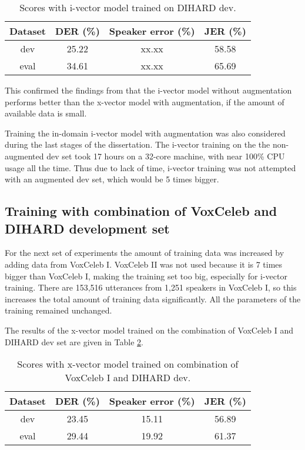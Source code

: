 		\begin{table}[h]
			\centering
			\begin{tabular}{|c|c|c|c|}
				\hline
				Dataset & DER (\%) & Speaker error (\%) & JER (\%) \\
				\hline
				dev & 25.22 & xx.xx & 58.58 \\
				\hline
				eval & 34.61 & xx.xx & 65.69 \\
				\hline
			\end{tabular}
			\caption{Scores with i-vector model trained on DIHARD dev.}
			\label{table-dev-ivec}
		\end{table}
		
		This confirmed the findings from \cite{huang2018jhu} that the i-vector model without augmentation performs better than the x-vector model with augmentation, if the amount of available data is small.
		
		Training the in-domain i-vector model with augmentation was also considered during the last stages of the dissertation. The i-vector training on the the non-augmented dev set took 17 hours on a 32-core machine, with near 100\% CPU usage all the time. Thus due to lack of time, i-vector training was not attempted with an augmented dev set, which would be 5 times bigger.
		
		\subsection{Training with combination of VoxCeleb and DIHARD development set}
			For the next set of experiments the amount of training data was increased by adding data from VoxCeleb I. VoxCeleb II was not used because it is 7 times bigger than VoxCeleb I, making the training set too big, especially for i-vector training. There are 153,516 utterances from 1,251 speakers in VoxCeleb I, so this increases the total amount of training data significantly. All the parameters of the training remained unchanged.
			
			The results of the x-vector model trained on the combination of VoxCeleb I and DIHARD dev set are given in Table \ref{table-voxdev-xvec}.
			
			\begin{table}[h]
				\centering
				\begin{tabular}{|c|c|c|c|}
					\hline
					Dataset & DER (\%) & Speaker error (\%) & JER (\%) \\
					\hline
					dev & 23.45 & 15.11 & 56.89 \\
					\hline
					eval & 29.44 & 19.92 & 61.37 \\
					\hline
				\end{tabular}
				\caption{Scores with x-vector model trained on combination of VoxCeleb I and DIHARD dev.}
				\label{table-voxdev-xvec}
			\end{table}
		
